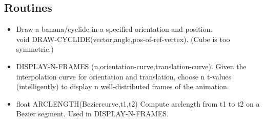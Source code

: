 \clearpage

\ifFull
\subsection{Routines}
\begin{itemize}
\item
	Draw a banana/cyclide in a specified orientation and position.\\
	void DRAW-CYCLIDE(vector,angle,pos-of-ref-vertex).
	(Cube is too symmetric.)
\item
	DISPLAY-N-FRAMES (n,orientation-curve,translation-curve).
	Given the interpolation curve for orientation and translation,
	choose n t-values (intelligently) to display n well-distributed
	frames of the animation.
\item
	float ARCLENGTH(Beziercurve,t1,t2)
	Compute arclength from t1 to t2 on a Bezier segment.
	Used in DISPLAY-N-FRAMES.
\end{itemize}
\fi


